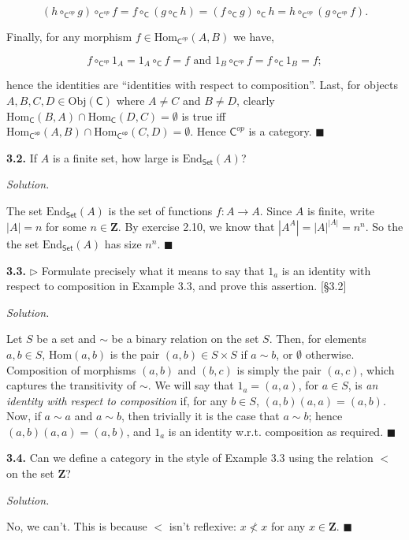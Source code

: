 \documentclass[14pt,parskip=full]{scrartcl}
\newcommand{\exercise}[3]{
\noindent
\textbf{#1.} #2

\noindent
\textit{Solution.}{\let\tpar\par \let\par\relax #3}
}
\newcommand*{\QEDA}{\hfill\ensuremath{\blacksquare}}
\newcommand{\Obj}{\mathrm{Obj}}
\newcommand{\Hom}{\mathrm{Hom}}
\newcommand\abs[1]{\left|#1\right|}
\begin{document}
{\[ (h \circ_{\mathsf{C}^{op}} g) \circ_{\mathsf{C}^{op}} f = f
\circ_{\mathsf{C}} (g \circ_{\mathsf{C}} h) = (f \circ_{\mathsf{C}} g)
\circ_{\mathsf{C}} h = h \circ_{\mathsf{C}^{op}} (g \circ_{\mathsf{C}^{op}} f).
\]

Finally, for any morphism $f\in\Hom_{\mathsf{C}^{op}}(A,B)$ we have,

\[ f \circ_{\mathsf{C}^{op}} 1_A = 1_A \circ_{\mathsf{C}} f = f \text{ and }
1_B \circ_{\mathsf{C}^{op}} f = f \circ_{\mathsf{C}} 1_B = f; \]

hence the identities are ``identities with respect to composition''. Last, for
objects $A,B,C,D\in\Obj(\mathsf{C})$ where $A\neq C$ and $B\neq D$,
clearly $\Hom_{\mathsf{C}}(B,A)\cap\Hom_{\mathsf{C}}(D,C)=\emptyset$ is true iff 
$\Hom_{\mathsf{C^{op}}}(A,B)\cap\Hom_{\mathsf{C^{op}}}(C,D)=\emptyset$. Hence
$\mathsf{C}^{op}$ is a category.
\QEDA

}

\exercise
{3.2}{If $A$ is a finite set, how large is $\mathrm{End}_{\mathsf{Set}}(A)$?}{

The set $\mathrm{End}_{\mathsf{Set}}(A)$ is the set of functions $f:A\to A$.
Since $A$ is finite, write $\abs{A} = n$ for some $n\in\mathbf{Z}$. By exercise
2.10, we know that $\abs{A^A} = \abs{A}^{\abs{A}} = n^n$. So the the set
$\mathrm{End}_{\mathsf{Set}}(A)$ has size $n^n$.
\QEDA

}

\exercise
{3.3}{$\rhd$ Formulate precisely what it means to say that $1_a$ is an identity
with respect to composition in Example 3.3, and prove this assertion. [\S3.2]}{

Let $S$ be a set and $\sim$ be a binary relation on the set $S$. Then, for
elements $a,b\in S$, $\Hom(a,b)$ is the pair $(a,b)\in S\times S$ if $a\sim b$,
or $\emptyset$ otherwise. Composition of morphisms $(a,b)$ and $(b,c)$ is simply
the pair $(a,c)$, which captures the transitivity of $\sim$. We will say that
$1_a = (a,a)$, for $a\in S$, is \textit{an identity with respect to composition}
if, for any $b\in S$, $(a,b)(a,a) = (a,b)$. Now, if $a\sim a$ and $a\sim b$,
then trivially it is the case that $a\sim b$; hence $(a,b)(a,a) = (a,b)$, and
$1_a$ is an identity w.r.t. composition as required.
\QEDA

}

\exercise
{3.4}{Can we define a category in the style of Example 3.3 using the relation
$<$ on the set $\mathbf{Z}$?}{

No, we can't. This is because $<$ isn't reflexive: $x\not<x$ for any
$x\in\mathbf{Z}$.
\QEDA

}
\end{document}

